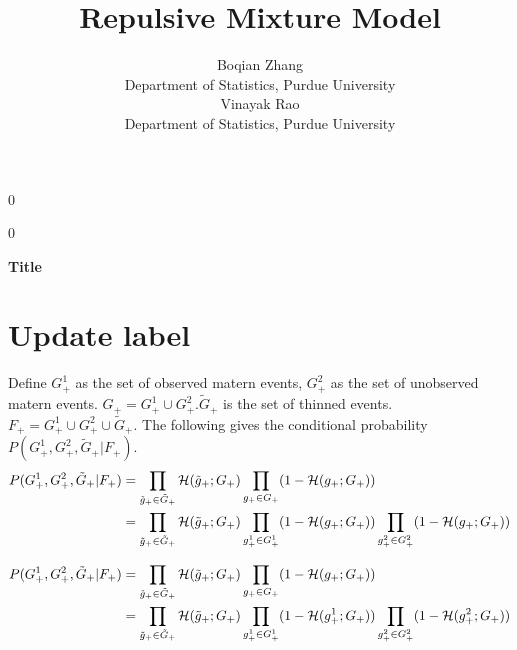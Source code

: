 \documentclass[12pt]{article}
\newcommand{\blind}{0}
\begin{document}
%

\def\spacingset#1{\renewcommand{\baselinestretch}%
{#1}\small\normalsize} \spacingset{1}



\blind
{
  \title{\bf Repulsive Mixture Model}
  \author{  
    Boqian Zhang \\
    Department of Statistics, Purdue University\\
    Vinayak Rao\\
    Department of Statistics, Purdue University\\
    }
  \maketitle
} \fi

\blind
{
  \bigskip
  \bigskip
  \bigskip
  \begin{center}
    {\LARGE\bf Title}
\end{center}
  \medskip
} \fi

\bigskip
\begin{abstract}
\spacingset{1.45}
\end{abstract}

\section{Update label}
Define $G_+^1$ as the set of observed matern events, $G_+^2$ as the set of unobserved matern events. $G_+ = G_+^1 \cup G_+^2$.$\tilde{G}_+$ is the set of thinned events. $F_+ = G_+^1 \cup G_+^2 \cup \tilde{G}_+$. The following gives the conditional probability $P(G_+^1, G_+^2, \tilde{G}_+ | F_+)$.
\begin{align*}
P(G_+^1, G_+^2, \tilde{G}_+ | F_+) &= \prod_{\tilde{g}_+ \in \tilde{G}_+} {\mathcal H} (\tilde{g}_+ ; G_+) \prod_{g_+ \in G_+} ( 1-{\mathcal H} (g_+ ; G_+) )\\
& = \prod_{\tilde{g}_+ \in \tilde{G}_+} {\mathcal H} (\tilde{g}_+ ; G_+) \prod_{g^1_+ \in G^1_+} ( 1- {\mathcal H} (g_+ ; G_+) ) \prod_{g^2_+ \in G^2_+} ( 1- {\mathcal H} (g_+ ; G_+) )
\end{align*}

\begin{align*}
P(G_+^1, G_+^2, \tilde{G}_+ | F_+) &= \prod_{\tilde{g}_+ \in \tilde{G}_+} {\mathcal H} (\tilde{g}_+ ; G_+) \prod_{g_+ \in G_+} ( 1-{\mathcal H} (g_+ ; G_+) )\\
& = \prod_{\tilde{g}_+ \in \tilde{G}_+} {\mathcal H} (\tilde{g}_+ ; G_+) \prod_{g^1_+ \in G^1_+} ( 1- {\mathcal H} (g_+^1 ; G_+) ) \prod_{g^2_+ \in G^2_+} ( 1- {\mathcal H} (g_+^2 ; G_+) )
\end{align*}
\end{document}
